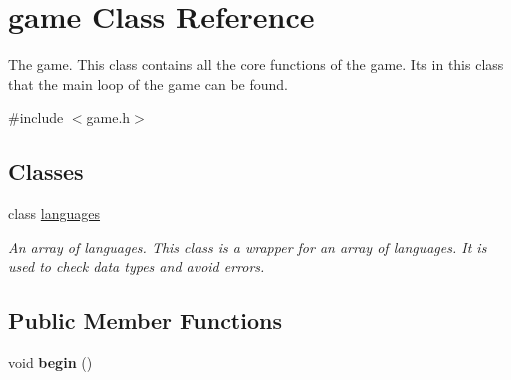 \hypertarget{classgame}{}\section{game Class Reference}
\label{classgame}


The game. This class contains all the core functions of the game. It\textquotesingle{}s in this class that the main loop of the game can be found.  




{\ttfamily \#include $<$game.\+h$>$}

\subsection*{Classes}
\begin{DoxyCompactItemize}
\item 
class \mbox{\hyperlink{classgame_1_1languages}{languages}}
\begin{DoxyCompactList}\small\item\em An array of languages. This class is a wrapper for an array of languages. It is used to check data types and avoid errors. \end{DoxyCompactList}\end{DoxyCompactItemize}
\subsection*{Public Member Functions}
\begin{DoxyCompactItemize}
\item 
\mbox{\label{classgame_a0a81107150e7d981254c0c9609cf2b84}} 
void {\bfseries begin} ()
\end{DoxyCompactItemize}
